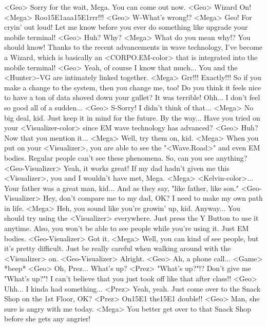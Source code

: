 <Geo> Sorry for the wait, Mega. You can come out now. 
<Geo> Wizard On! 
<Mega> Roo{15}{E1}aaa{15}{E1}rrr!!! 
<Geo> W-What's wrong!? 
<Mega> Geo! For cryin' out loud! 
Let me know before you ever do something like upgrade your mobile terminal! 
<Geo> Huh? 
Why? 
<Mega> What do you mean why!? You should know! 
Thanks to the recent advancements in wave technology, I've become a 
Wizard, which is basically an <CORPO.EM-color> that is integrated into the mobile terminal! 
<Geo> Yeah, of course I know that much... 
You and the <Hunter>-VG are intimately linked together. 
<Mega> Grr!!! Exactly!!! 
So if you make a change to the system, then you change me, too! 
Do you think it feels nice to have a ton of data shoved down your gullet? 
It was terrible! Ohh... 
I don't feel so good all of a sudden... 
<Geo> S-Sorry! I didn't think of that... 
<Mega> No big deal, kid. Just keep it in mind for the future. 
By the way... 
Have you tried on your <Visualizer-color> since EM wave technology has advanced? 
<Geo> Huh? Now that you mention it... 
<Mega> Well, try them on, kid. 
<Mega> When you put on your <Visualizer>, you are able to 
see the "<Wave.Road>" and even EM bodies. 
Regular people can't see these phenomena. 
So, can you see anything? 
<Geo-Visualizer> Yeah, it works great! 
If my dad hadn't given me this <Visualizer>, you and I wouldn't have met, Mega. 
<Mega> <Kelvin-color>... Your father was a great man, kid... 
And as they say, "like father, like son." 
<Geo-Visualizer> Hey, don't compare me to my dad, OK? 
I need to make my own path in life. 
<Mega> Heh, you sound like you're growin' up, kid. 
Anyway... You should try using the <Visualizer> everywhere. 
Just press the Y Button to use it anytime. 
Also, you won't be able to see people while you're using it. Just EM bodies. 
<Geo-Visualizer> Got it. 
<Mega> Well, you can kind of see people, but it's pretty difficult. 
Just be really careful when walking around with the <Visualizer> on. 
<Geo-Visualizer> Alright. 
<Geo> Ah, a phone call... 
<Game> *beep* 
<Geo> Oh, Prez... What's up? 
<Prez> "What's up?"!? 
Don't give me "What's up?"! I can't believe that you 
just took off like that after class!! 
<Geo> Uhh... I kinda had something... 
<Prez> Yeah, yeah. 
Just come over to the Snack Shop on the 1st Floor, OK? 
<Prez> On{15}{E1} the{15}{E1} double!! 
<Geo> Man, she sure is angry with me today. 
<Mega> You better get over to that Snack Shop before she gets any angrier! 
